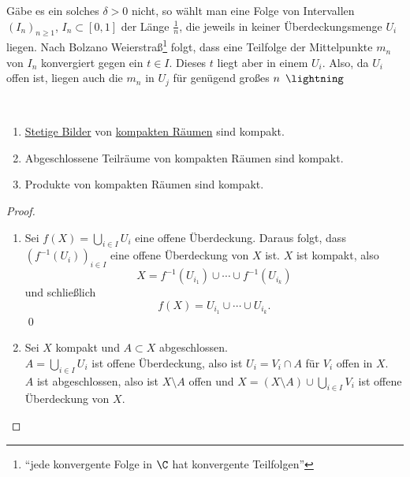 \begin{remark}
  Gäbe es ein solches \( \delta > 0 \) nicht, so wählt man eine Folge von Intervallen \( {(I_n)}_{n \geq 1} \), \( I_n \subset [0,1] \) der Länge \( \tfrac{1}{n} \), die jeweils in keiner Überdeckungsmenge \( U_i \) liegen. Nach Bolzano Weierstraß\footnote{``jede konvergente Folge in \( \C \) hat konvergente Teilfolgen''} folgt, dass eine Teilfolge der Mittelpunkte \( m_n \) von \( I_n \) konvergiert gegen ein \( t \in I \). Dieses \( t \) liegt aber in einem \( U_i \). Also, da \( U_i \) offen ist, liegen auch die \( m_n \) in \( U_j \) für genügend großes \( n \enskip \lightning \)
\end{remark}

\begin{theorem}
  \
  \begin{enumerate}
    \item \hyperref[def:stetig]{Stetige Bilder} von \hyperref[def:kompakt]{kompakten Räumen} sind kompakt.
    \item Abgeschlossene Teilräume von kompakten Räumen sind kompakt.
    \item Produkte von kompakten Räumen sind kompakt. 
  \end{enumerate}
  \begin{proof}
    \
    \begin{enumerate}
      \item Sei \( f(X) = \bigcup_{i \in I} U_i \) eine offene Überdeckung. Daraus folgt, dass \( {\left( f^{-1}(U_i) \right)}_{i \in I} \) eine offene Überdeckung von \( X \) ist. \( X \) ist kompakt, also
      \begin{equation*}
        X = f^{-1}(U_{i_1}) \cup \cdots \cup f^{-1}(U_{i_k})
      \end{equation*}
      und schließlich
      \begin{equation*}
        f(X) = U_{i_1} \cup \cdots \cup U_{i_k}\text{.}
      \end{equation*}
      \qed{}
      \item Sei \( X \) kompakt und \( A \subset X \) abgeschlossen. \\
        \( A = \bigcup_{i \in I} U_i \) ist offene Überdeckung, also ist \( U_i = V_i \cap A \) für \( V_i \) offen in \( X \). \\
        \( A \) ist abgeschlossen, also ist \( X \setminus A \) offen und \( X = (X \setminus A) \cup \bigcup_{i \in I} V_i \) ist offene Überdeckung von \( X \). \\

\end{enumerate}
\end{proof}
\end{theorem}
